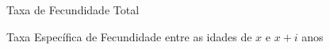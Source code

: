 \begin{simbolos}
    \item [$F$] Taxa de Fecundidade Total
    \item [${}_i{f}_x$] Taxa Específica de Fecundidade entre as idades de $x$ e $x+i$ anos
\end{simbolos}
    